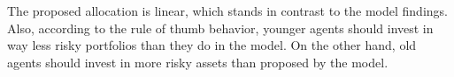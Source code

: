 \documentclass[12pt,a4paper]{article}
\begin{document}
The proposed allocation is linear, which stands in contrast to the model findings. Also, according to the rule of thumb behavior, younger agents should invest in way less risky portfolios than they do in the model. On the other hand, old agents should invest in more risky assets than proposed by the model.
\end{document}
